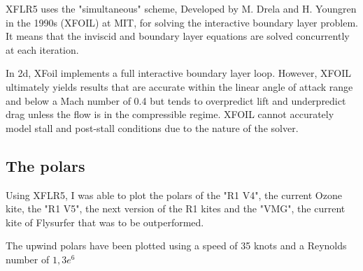 XFLR5 uses the "simultaneous" scheme, Developed by M. Drela and H. Youngren in the 1990s (XFOIL) at MIT, for solving the interactive boundary layer problem. It means that the inviscid and boundary layer equations are solved concurrently at each iteration\cite{XFLR5doc}.

In 2d, XFoil implements a full interactive boundary layer loop. However, XFOIL ultimately yields results that are accurate within the linear angle of attack range and below a Mach number of 0.4 but tends to overpredict lift and underpredict drag unless the flow is in the compressible regime. XFOIL cannot accurately model stall and post-stall conditions due to the nature of the solver\cite{XFOILlimits}.


\subsection{The polars}
\label{sub:Ch1.4.2}

Using XFLR5, I was able to plot the polars of the "R1 V4", the current Ozone kite, the "R1 V5", the next version of the R1 kites and the "VMG", the current kite of Flysurfer that was to be outperformed. 

The upwind polars have been plotted using a speed of 35 knots and a Reynolds number of $1,3e^{6}$

